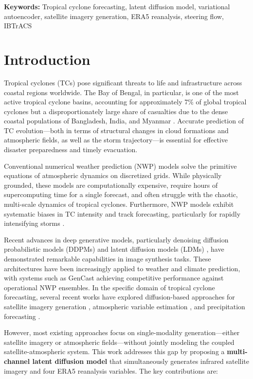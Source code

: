 \documentclass[12pt, a4paper]{article}
\begin{document}
\noindent\textbf{Keywords:} Tropical cyclone forecasting, latent diffusion model, variational autoencoder, satellite imagery generation, ERA5 reanalysis, steering flow, IBTrACS

\newpage
\tableofcontents
\newpage

\section{Introduction}

Tropical cyclones (TCs) pose significant threats to life and infrastructure across coastal regions worldwide. The Bay of Bengal, in particular, is one of the most active tropical cyclone basins, accounting for approximately 7\% of global tropical cyclones but a disproportionately large share of casualties due to the dense coastal populations of Bangladesh, India, and Myanmar \cite{nath2024forecasting}. Accurate prediction of TC evolution---both in terms of structural changes in cloud formations and atmospheric fields, as well as the storm trajectory---is essential for effective disaster preparedness and timely evacuation.

Conventional numerical weather prediction (NWP) models solve the primitive equations of atmospheric dynamics on discretized grids. While physically grounded, these models are computationally expensive, require hours of supercomputing time for a single forecast, and often struggle with the chaotic, multi-scale dynamics of tropical cyclones. Furthermore, NWP models exhibit systematic biases in TC intensity and track forecasting, particularly for rapidly intensifying storms \cite{wang2024global}.

Recent advances in deep generative models, particularly denoising diffusion probabilistic models (DDPMs) \cite{ho2020denoising} and latent diffusion models (LDMs) \cite{rombach2022high}, have demonstrated remarkable capabilities in image synthesis tasks. These architectures have been increasingly applied to weather and climate prediction, with systems such as GenCast \cite{price2023gencast} achieving competitive performance against operational NWP ensembles. In the specific domain of tropical cyclone forecasting, several recent works have explored diffusion-based approaches for satellite imagery generation \cite{nath2024forecasting, ren2025improving}, atmospheric variable estimation \cite{ling2024estimating}, and precipitation forecasting \cite{huang2024tcp}.

However, most existing approaches focus on single-modality generation---either satellite imagery or atmospheric fields---without jointly modeling the coupled satellite-atmospheric system. This work addresses this gap by proposing a \textbf{multi-channel latent diffusion model} that simultaneously generates infrared satellite imagery and four ERA5 reanalysis variables. The key contributions are:
\end{document}
